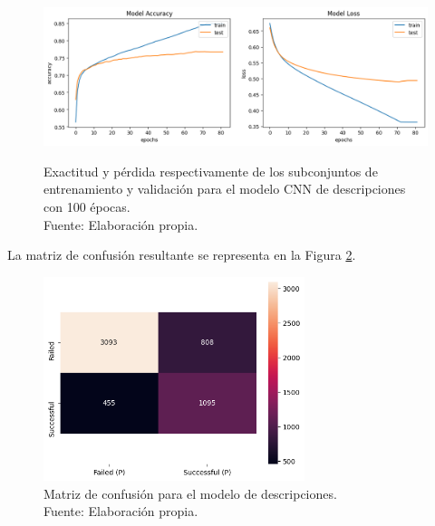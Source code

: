 \begin{figure}[!ht]
	\begin{center}
		\includegraphics[width=1\textwidth]{5/figures/description_model_acc_loss.png}
		\caption[Exactitud y pérdida respectivamente de los subconjuntos de entrenamiento y validación para el modelo CNN de descripciones con 100 épocas]{Exactitud y pérdida respectivamente de los subconjuntos de entrenamiento y validación para el modelo CNN de descripciones con 100 épocas.\\
		Fuente: Elaboración propia.}
		\vspace{-1cm}
		\label{5:fig4}
	\end{center}
\end{figure}

\newpage
La matriz de confusión resultante se representa en la Figura \ref{5:fig5}.

\begin{figure}[!ht]
	\begin{center}
		\includegraphics[width=0.68\textwidth]{5/figures/description_confusion_matrix.png}
		\caption[Matriz de confusión para el modelo de descripciones]{Matriz de confusión para el modelo de descripciones.\\
		Fuente: Elaboración propia.}
		\label{5:fig5}
	\end{center}
	\vspace{-0.5cm}
\end{figure}

